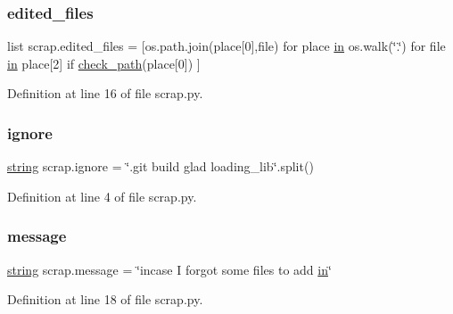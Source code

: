 \subsubsection{\texorpdfstring{edited\+\_\+files}{edited\_files}}
{\footnotesize\ttfamily list scrap.\+edited\+\_\+files = \mbox{[}os.\+path.\+join(place\mbox{[}0\mbox{]},file) for place \mbox{\hyperlink{glad_8h_a83ad0ee7f1e06b59c90271716e689080}{in}} os.\+walk(\char`\"{}.\char`\"{}) for file \mbox{\hyperlink{glad_8h_a83ad0ee7f1e06b59c90271716e689080}{in}} place\mbox{[}2\mbox{]} if \mbox{\hyperlink{namespacescrap_a32ed8c257e2ca3d4484dca9a4ba5b624}{check\+\_\+path}}(place\mbox{[}0\mbox{]}) \mbox{]}}



Definition at line 16 of file scrap.\+py.

\mbox{\label{namespacescrap_a7ccf9c21ee2bf2e2a8a3df42f1d7e7a9}} 
\subsubsection{\texorpdfstring{ignore}{ignore}}
{\footnotesize\ttfamily \mbox{\hyperlink{glad_8h_ae84541b4f3d8e1ea24ec0f466a8c568b}{string}} scrap.\+ignore = \char`\"{}.git build glad loading\+\_\+lib\char`\"{}.split()}



Definition at line 4 of file scrap.\+py.

\mbox{\label{namespacescrap_ad2ffb1c34088330deac4caf40a6be164}} 
\subsubsection{\texorpdfstring{message}{message}}
{\footnotesize\ttfamily \mbox{\hyperlink{glad_8h_ae84541b4f3d8e1ea24ec0f466a8c568b}{string}} scrap.\+message = \char`\"{}incase I forgot some files to add \mbox{\hyperlink{glad_8h_a83ad0ee7f1e06b59c90271716e689080}{in}}\char`\"{}}



Definition at line 18 of file scrap.\+py.

